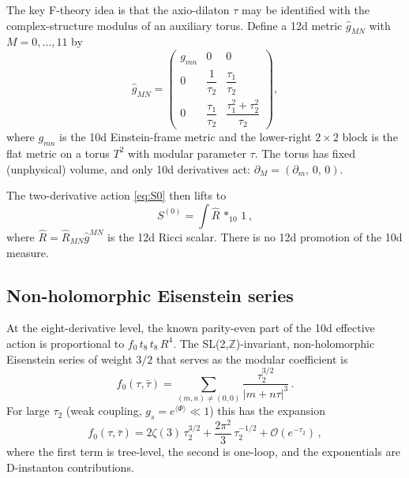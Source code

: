 The key F-theory idea is that the axio-dilaton $\tau$ may be identified
with the complex-structure modulus of an auxiliary torus.
Define a 12d metric $\hat{g}_{MN}$ with $M = 0,\dots,11$ by
\begin{equation}\label{eq:12d_metric}
    \hat{g}_{MN}
    = \begin{pmatrix}
        g_{mn} & 0 & 0 \\[4pt]
        0 & \dfrac{1}{\tau_2} & \dfrac{\tau_1}{\tau_2} \\[6pt]
        0 & \dfrac{\tau_1}{\tau_2} & \dfrac{\tau_1^2+\tau_2^2}{\tau_2}
    \end{pmatrix},
\end{equation}
where $g_{mn}$ is the 10d Einstein-frame metric and the lower-right $2\times2$
block is the flat metric on a torus $T^2$ with modular parameter $\tau$.
The torus has fixed (unphysical) volume, and only 10d derivatives act:
$\partial_M = (\partial_m,\,0,\,0)$.

The two-derivative action \eqref{eq:S0} then lifts to
\begin{equation}\label{eq:S0_12d}
    S^{(0)} = \int \hat{R}\,{*_{10}}\,1\,,
\end{equation}
where $\hat R = \hat R_{MN}\hat g^{MN}$ is the 12d Ricci scalar.
There is no 12d promotion of the 10d measure.

\subsection{Non-holomorphic Eisenstein series}

At the eight-derivative level, the known parity-even part of the 10d
effective action is proportional to $f_0\,t_8\,t_8\,R^4$.
The SL(2,$\mathbb{Z}$)-invariant, non-holomorphic Eisenstein series of weight $3/2$
that serves as the modular coefficient is
\begin{equation}\label{eq:f0}
    f_0(\tau,\bar\tau)
    = \sum_{(m,n)\neq(0,0)} \frac{\tau_2^{3/2}}{|m + n\tau|^3}\,.
\end{equation}
For large $\tau_2$ (weak coupling, $g_s = e^{\langle\Phi\rangle} \ll 1$) this has the expansion
\begin{equation}\label{eq:f0_expansion}
    f_0(\tau,\bar\tau)
    = 2\zeta(3)\,\tau_2^{3/2}
      + \frac{2\pi^2}{3}\,\tau_2^{-1/2}
      + \mathcal{O}(e^{-\tau_2})\,,
\end{equation}
where the first term is tree-level, the second is one-loop,
and the exponentials are D-instanton contributions.

